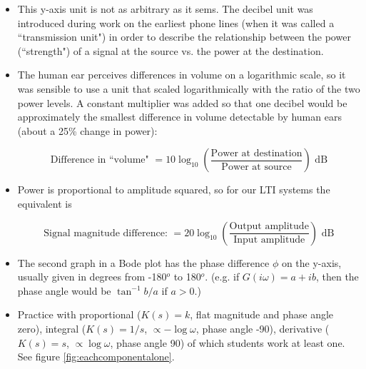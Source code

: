 \documentclass{article}
\begin{document}
\begin{itemize}
\item This y-axis unit is not as arbitrary as it sems. The decibel unit was introduced during work on the earliest phone lines (when it was called a ``transmission unit") in order to describe the relationship between the power (``strength") of a signal at the source vs. the power at the destination.

\item The human ear perceives differences in volume on a logarithmic scale, so it was sensible to use a unit that scaled logarithmically with the ratio of the two power levels. A constant multiplier was added so that one decibel would be approximately the smallest difference in volume detectable by human ears (about a 25\% change in power):

\[ \textrm{Difference in ``volume" } = 10 \log_{10} \left( \frac{\textrm{Power at destination}}{\textrm{Power at source}} \right) \textrm{ dB} \]

\item Power is proportional to amplitude squared, so for our LTI systems the equivalent is

\[ \textrm{Signal magnitude difference: } = 20 \log_{10} \left( \frac{\textrm{Output amplitude}}{\textrm{Input amplitude}} \right) \textrm{ dB} \]

\item The second graph in a Bode plot has the phase difference $\phi$ on the y-axis, usually given in degrees from -180$^o$ to 180$^o$. (e.g. if $G(i\omega) = a + ib$, then the phase angle would be $\tan^{-1} b/a$ if $a>0$.)\\

\item Practice with proportional ($K(s) = k$, flat magnitude and phase angle zero), integral ($K(s) = 1/s$, $\propto - \log \omega$, phase angle -90), derivative ($K(s) = s$, $\propto \log \omega$, phase angle 90) of which students work at least one. See figure \ref{fig:eachcomponentalone}.


\end{itemize}
\end{document}
